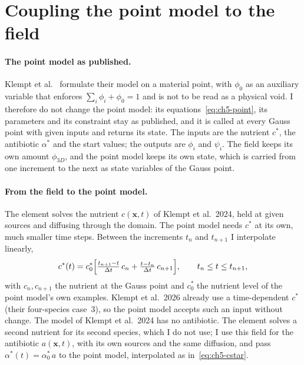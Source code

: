 
\section{Coupling the point model to the field}
\label{sec:ch5-composition}

\paragraph{The point model as published.}
Klempt et al.~\cite{Klempt2026ContinuumBacterialGrowth} formulate their model on a
material point, with $\phi_0$ as an auxiliary variable that enforces $\sum_i\phi_i+\phi_0=1$
and is not to be read as a physical void. I therefore do not change the point model: its
equations~\eqref{eq:ch5-point}, its parameters and its constraint stay as published, and it is
called at every Gauss point with given inputs and returns its state. The inputs are the nutrient $c^*$,
the antibiotic $\alpha^*$ and the start values; the outputs are $\phi_i$ and $\psi_i$. The
field keeps its own amount $\phi_{3D}$, and the point model keeps its own state, which is carried
from one increment to the next as state variables of the Gauss point.

\paragraph{From the field to the point model.}
The element solves the nutrient $c(\mathbf x,t)$ of Klempt et al.\ 2024, held at given sources
and diffusing through the domain. The point model needs $c^*$ at its own, much smaller time
steps. Between the increments $t_n$ and $t_{n+1}$ I interpolate linearly,
\begin{equation}
c^*(t)=c^*_0\Bigl[\tfrac{t_{n+1}-t}{\Delta t}\,c_n+\tfrac{t-t_n}{\Delta t}\,c_{n+1}\Bigr],
\qquad t_n\le t\le t_{n+1},
\label{eq:ch5-cstar}
\end{equation}
with $c_n,c_{n+1}$ the nutrient at the Gauss point and $c^*_0$ the nutrient level of the point
model's own examples. Klempt et al.\ 2026 already use a time-dependent $c^*$ (their four-species
case~3), so the point model accepts such an input without change. The model of Klempt et al.\
2024 has no antibiotic. The element solves a second nutrient for its second species, which I do
not use; I use this field for the antibiotic $a(\mathbf x,t)$, with its own sources and the same
diffusion, and pass $\alpha^*(t)=\alpha^*_0\,a$ to the point model, interpolated as
in~\eqref{eq:ch5-cstar}.

